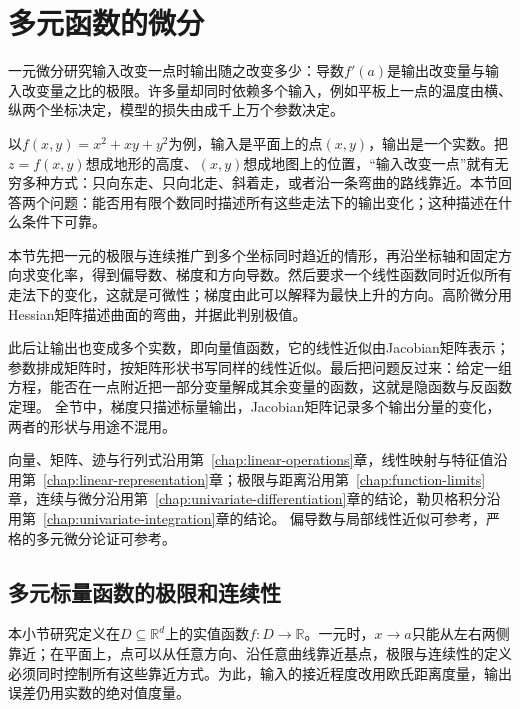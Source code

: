 \par{}
\section{多元函数的微分}
\label{sec:analysis-multivariable-differentiation}
\label{sec:multivariable-differentiation}

一元微分研究输入改变一点时输出随之改变多少：导数$f'(a)$是输出改变量与输入改变量之比的极限。许多量却同时依赖多个输入，例如平板上一点的温度由横、纵两个坐标决定，模型的损失由成千上万个参数决定。

以$f(x,y)=x^2+xy+y^2$为例，输入是平面上的点$(x,y)$，输出是一个实数。把$z=f(x,y)$想成地形的高度、$(x,y)$想成地图上的位置，“输入改变一点”就有无穷多种方式：只向东走、只向北走、斜着走，或者沿一条弯曲的路线靠近。本节回答两个问题：能否用有限个数同时描述所有这些走法下的输出变化；这种描述在什么条件下可靠。

本节先把一元的极限与连续推广到多个坐标同时趋近的情形，再沿坐标轴和固定方向求变化率，得到偏导数、梯度和方向导数。然后要求一个线性函数同时近似所有走法下的变化，这就是可微性；梯度由此可以解释为最快上升的方向。高阶微分用Hessian矩阵描述曲面的弯曲，并据此判别极值。

此后让输出也变成多个实数，即向量值函数，它的线性近似由Jacobian矩阵表示；参数排成矩阵时，按矩阵形状书写同样的线性近似。最后把问题反过来：给定一组方程，能否在一点附近把一部分变量解成其余变量的函数，这就是隐函数与反函数定理。
全节中，梯度只描述标量输出，Jacobian矩阵记录多个输出分量的变化，两者的形状与用途不混用。

向量、矩阵、迹与行列式沿用第~\ref{chap:linear-operations}章，线性映射与特征值沿用第~\ref{chap:linear-representation}章；极限与距离沿用第~\ref{chap:function-limits}章，连续与微分沿用第~\ref{chap:univariate-differentiation}章的结论，勒贝格积分沿用第~\ref{chap:univariate-integration}章的结论。
偏导数与局部线性近似可参考，严格的多元微分论证可参考。

\subsection{多元标量函数的极限和连续性}
\label{sec:multivariable-limits-continuity}

本小节研究定义在$D\subseteq\mathbb R^d$上的实值函数$f:D\to\mathbb R$。一元时，$x\to a$只能从左右两侧靠近；在平面上，点可以从任意方向、沿任意曲线靠近基点，极限与连续性的定义必须同时控制所有这些靠近方式。为此，输入的接近程度改用欧氏距离度量，输出误差仍用实数的绝对值度量。

